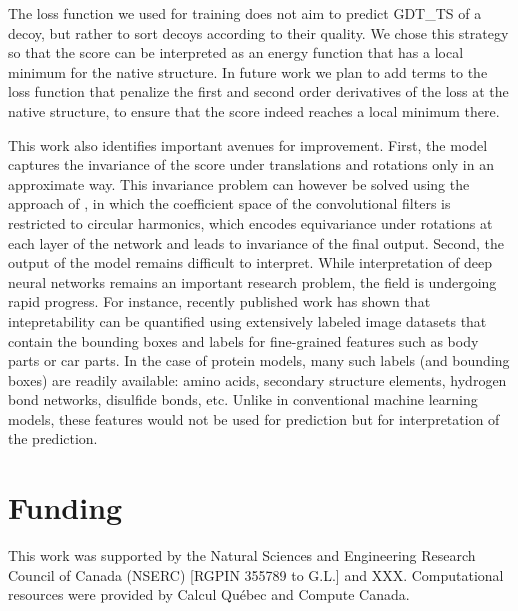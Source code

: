 \documentclass{bioinfo}
\begin{document}
The loss function we used for training does not aim to predict GDT\_TS
of a decoy, but rather to sort decoys according to their quality. We
chose this strategy so that the score can be interpreted as an energy
function that has a local minimum for the native structure. In future
work we plan to add terms to the loss function that penalize the first
and second order derivatives of the loss at the native structure, to
ensure that the score indeed reaches a local minimum there.

This work also identifies important avenues for improvement. First,
the model captures the invariance of the score under translations and
rotations only in an approximate way. This invariance problem can
however be solved using the approach of \citet{worrall2016harmonic},
in which the coefficient space of
the convolutional filters is restricted to circular harmonics, which
encodes equivariance under rotations at each layer of the network and
leads to invariance of the final output.
%
Second, the output of the model remains difficult to interpret. While
interpretation of deep neural networks remains an important research
problem, the field is undergoing rapid progress. For instance,
recently published work \citep{bau2017network} has shown that
intepretability can be quantified using extensively labeled image
datasets that contain the bounding boxes and labels for fine-grained
features such as body parts or car parts. In the case of protein
models, many such labels (and bounding boxes) are readily available:
amino acids, secondary structure elements, hydrogen bond networks,
disulfide bonds, etc. Unlike in conventional machine learning models,
these features would not be used for prediction but for interpretation
of the prediction.

\section*{Funding}
This work was supported by the Natural Sciences and Engineering Research
Council of Canada (NSERC) [RGPIN 355789 to G.L.] and XXX.
Computational resources were provided by Calcul Qu{\'e}bec and
Compute Canada.




\end{document}

